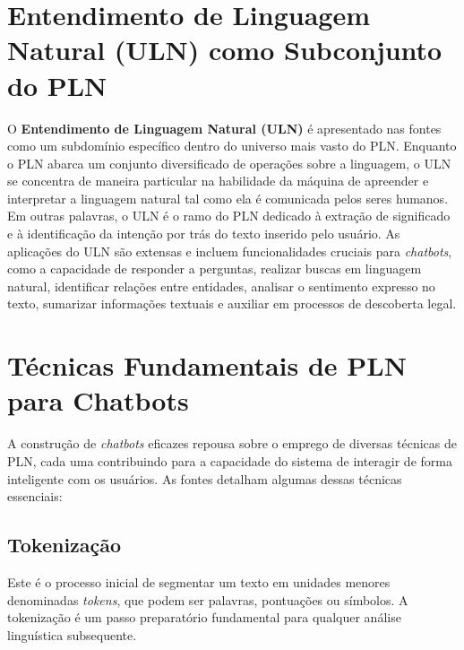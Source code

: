 \documentclass[14pt,a4paper,oneside]{book}
\begin{document}
\section{Entendimento de Linguagem Natural (ULN) como Subconjunto do PLN}

O \textbf{Entendimento de Linguagem Natural (ULN)} é apresentado nas fontes como um subdomínio específico dentro do universo mais vasto do PLN. Enquanto o PLN abarca um conjunto diversificado de operações sobre a linguagem, o ULN se concentra de maneira particular na habilidade da máquina de apreender e interpretar a linguagem natural tal como ela é comunicada pelos seres humanos. Em outras palavras, o ULN é o ramo do PLN dedicado à extração de significado e à identificação da intenção por trás do texto inserido pelo usuário. As aplicações do ULN são extensas e incluem funcionalidades cruciais para \textit{chatbots}, como a capacidade de responder a perguntas, realizar buscas em linguagem natural, identificar relações entre entidades, analisar o sentimento expresso no texto, sumarizar informações textuais e auxiliar em processos de descoberta legal.


\section{Técnicas Fundamentais de PLN para Chatbots}

A construção de \textit{chatbots} eficazes repousa sobre o emprego de diversas técnicas de PLN, cada uma contribuindo para a capacidade do sistema de interagir de forma inteligente com os usuários. As fontes detalham algumas dessas técnicas essenciais:

\subsection{Tokenização}

Este é o processo inicial de segmentar um texto em unidades menores denominadas \textit{tokens}, que podem ser palavras, pontuações ou símbolos. A tokenização é um passo preparatório fundamental para qualquer análise linguística subsequente. 
\end{document}
